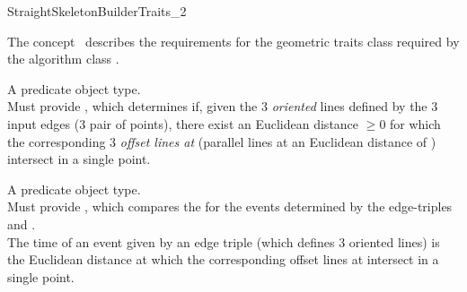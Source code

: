 
\begin{ccRefConcept}{StraightSkeletonBuilderTraits_2}



\ccDefinition

The concept \ccRefName\ describes the requirements for the geometric traits class required by the algorithm class .

\ccTypes
  \ccGlue
  \ccGlue
  \ccGlue

  
{A predicate object type.\\
Must provide , which determines if, given the 3 \textit{oriented} lines defined by the 3 input edges (3 pair of points), there exist an Euclidean distance  $\geq 0$ for which the corresponding 3 \textit{offset lines at } (parallel lines at an Euclidean distance of ) intersect in a single point.\\
}

{A predicate object type.\\
Must provide , which compares the  for the events determined by the edge-triples  and .\\
The time of an event given by an edge triple (which defines 3 oriented lines) is the Euclidean distance  at which the corresponding offset lines at  intersect in a single point.\\
}


\end{ccRefConcept}

